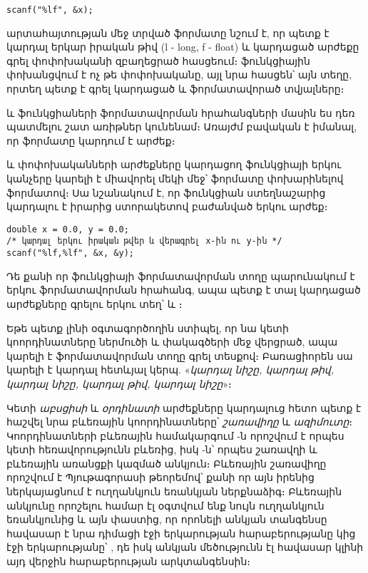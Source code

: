 \begin{Verbatim}
scanf("%lf", &x);
\end{Verbatim}

արտահայտության մեջ տրված  ֆորմատը նշում է, որ պետք է
կարդալ երկար իրական թիվ (l - long, f - float) և կարդացած արժեքը գրել
 փոփոխականի զբաղեցրած հասցեում։  ֆունկցիային
փոխանցվում է ոչ թե փոփոխականը, այլ նրա հասցեն՝ այն տեղը, որտեղ պետք է
գրել կարդացած և ֆորմատավորած տվյալները։

 և  ֆունկցիաների ֆորմատավորման հրահանգների
մասին ես դեռ պատմելու շատ առիթներ կունենամ։ Առայժմ բավական է իմանալ, որ
 ֆորմատը կարդում է  արժեք։

 և  փոփոխականների արժեքները կարդացող 
ֆունկցիայի երկու կանչերը կարելի է միավորել մեկի մեջ՝ 
ֆորմատը փոխարինելով  ֆորմատով։ Սա նշանակում է, որ
 ֆունկցիան ստեղնաշարից կարդալու է իրարից ստորակետով
բաժանված երկու  արժեք։

\begin{Verbatim}
double x = 0.0, y = 0.0;
/* կարդալ երկու իրական թվեր և վերագրել x-ին ու y-ին */
scanf("%lf,%lf", &x, &y);
\end{Verbatim}

Դե քանի որ  ֆունկցիայի ֆորմատավորման տողը պարունակում է
երկու ֆորմատավորման հրահանգ, ապա պետք է տալ կարդացած արժեքները գրելու
երկու տեղ՝  և ։

Եթե պետք լինի օգտագործողին ստիպել, որ նա կետի կոորդինատները ներմուծի
\code{(} և \code{)} փակագծերի մեջ վերցրած, ապա կարելի է
ֆորմատավորման տողը գրել  տեսքով։ Բառացիորեն սա
կարելի է կարդալ հետևյալ կերպ. «\emph{կարդալ \code{(} նիշը, կարդալ
 թիվ, կարդալ \code{,} նիշը, կարդալ  թիվ,
կարդալ \code{)} նիշը}»։

Կետի  \emph{աբսցիսի} և  \emph{օրդինատի} արժեքները
կարդալուց հետո պետք է հաշվել նրա բևեռային կոորդինատները՝ 
\emph{շառավիղը} և  \emph{ազիմուտը}։ Կոորդինատների բևեռային
համակարգում -ն որոշվում է որպես կետի հեռավորությունն բևեռից,
իսկ -ն՝ որպես շառավղի և բևեռային առանցքի կազմած անկյուն։
Բևեռային շառավիղը որոշվում է Պյութագորասի թեորեմով՝ քանի որ այն իրենից
ներկայացնում է ուղղանկյուն եռանկյան ներքնաձիգ։ Բևեռային անկյունը
որոշելու համար էլ օգտվում ենք նույն ուղղանկյուն եռանկյունից և այն
փաստից, որ որոնելի անկյան տանգենսը հավասար է նրա դիմացի էջի երկարության
հարաբերությանը կից էջի երկարությանը՝ , դե իսկ անկյան
մեծությունն էլ հավասար կլինի այդ վերջին հարաբերության արկտանգենսին։

